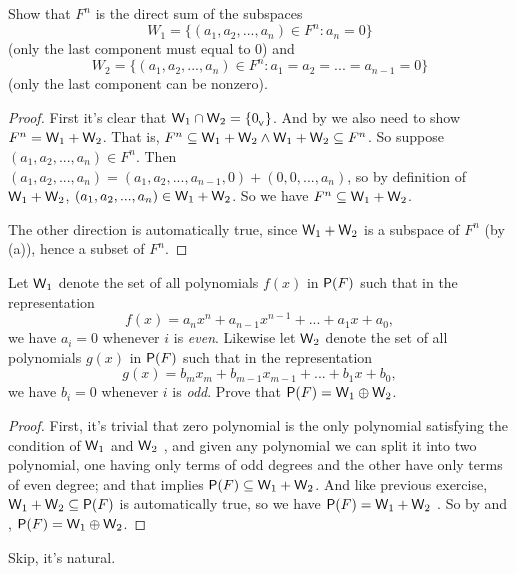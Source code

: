 \begin{exercise} \label{exercise 1.3.24}
Show that \(F^n\) is the direct sum of the subspaces
\[
    W_1 = \{(a_1, a_2, ..., a_n) \in F^n : a_n = 0 \}
\]
(only the last component must equal to \(0\)) and
\[
    W_2 = \{(a_1, a_2, ..., a_n) \in F^n : a_1 = a_2 = ... = a_{n - 1} = 0 \}
\]
(only the last component can be nonzero).
\end{exercise}

\begin{proof}
First it's clear that \(\textsf{W}_1 \cap \textsf{W}_2 = \{ 0_{_{\textsf{V}}} \}\).
And by  we also need to show \(F^n = \textsf{W}_1 + \textsf{W}_2\).
That is, \(F^n \subseteq \textsf{W}_1 + \textsf{W}_2 \land \textsf{W}_1 + \textsf{W}_2 \subseteq F^n\).
So suppose \((a_1, a_2, ..., a_n) \in F^n\).
Then \((a_1, a_2, ..., a_n) = (a_1, a_2, ..., a_{n - 1}, 0) + (0, 0, ..., a_n)\), so by definition of \(\textsf{W}_1 + \textsf{W}_2\), \((a_1, a_2, ..., a_n) \in \textsf{W}_1 + \textsf{W}_2\).
So we have \(F^n \subseteq \textsf{W}_1 + \textsf{W}_2\).

The other direction is automatically true, since \(\textsf{W}_1 + \textsf{W}_2\) is a subspace of \(F^n\) (by (a)), hence a subset of \(F^n\).
\end{proof}

\begin{exercise} \label{exercise 1.3.25}
Let \(\textsf{W}_1\) denote the set of all polynomials \(f(x)\) in \(\textsf{P}(F)\) such that in the representation
\[
    f(x) = a_n x^n + a_{n - 1} x^{n - 1} + ... + a_1 x + a_0,
\]
we have \(a_i = 0\) whenever \(i\) is \emph{even}.
Likewise let \(\textsf{W}_2\) denote the set of all polynomials \(g(x)\) in \(\textsf{P}(F)\) such that in the representation
\[
    g(x) = b_m x_m + b_{m - 1} x_{m - 1} + ... + b_1 x + b_0,
\]
we have \(b_i = 0\) whenever \(i\) is \emph{odd}.
Prove that \(\textsf{P}(F) = \textsf{W}_1 \oplus \textsf{W}_2\).
\end{exercise}

\begin{proof}
First, it's trivial that zero polynomial is the only polynomial satisfying the condition of \(\textsf{W}_1\) and \(\textsf{W}_2\) ,
and given any polynomial we can split it into two polynomial, one having only terms of odd degrees and the other have only terms of even degree;
and that implies \(\textsf{P}(F) \subseteq \textsf{W}_1 + \textsf{W}_2\).
And like previous exercise, \(\textsf{W}_1 + \textsf{W}_2 \subseteq \textsf{P}(F)\) is automatically true, so we have \(\textsf{P}(F) = \textsf{W}_1 + \textsf{W}_2\) .
So by  and , \(\textsf{P}(F) = \textsf{W}_1 \oplus \textsf{W}_2\).
\end{proof}

\begin{exercise} \label{exercise 1.3.26}
Skip, it's natural.
\end{exercise}

